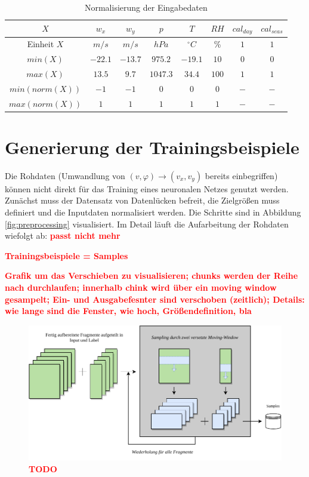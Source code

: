 \documentclass[
12pt, %
toc=listofnumbered, %
toc=chapterentrydotfill, %
numbers=noenddot, %
captions=tableheading, %
bibliography=numbered
]{scrreprt}
\let\Oldsection\section
\renewcommand{\section}{\FloatBarrier\Oldsection}
\newcommand{\highlight}[1]{\textbf{\textcolor{red}{#1}}}
\begin{document}
\begin{table}[ht]
	\centering
	\caption{Normalisierung der Eingabedaten}
	\begin{tabular}{|c|c|c|c|c|c|c|c|}
		\hline
		\rowcolor{color80}
		\textbf{$X$} & \textbf{$w_x$} & \textbf{$w_y$} & \textbf{$p$} & \textbf{$T$} & \textbf{$RH$} & \textbf{$cal_{day}$} & \textbf{$cal_{seas}$} \\ \hline
		Einheit $X$ & $m/s$ & $m/s$ & $hPa$ & $^\circ C$ & \% & $1$ & $1$ \\ \hline
		$min(X)$       & $-22.1$ & $-13.7$ & $975.2$ & $-19.1$ & $10$ & $0$ & $0$ \\ \hline
		$max(X)$       & $13.5$ & $9.7$ & $1047.3$ & $34.4$ & $100$ & $1$ & $1$ \\ \hline
		$min(norm(X))$ & $-1$ & $-1$ & $0$ & $0$ & $0$ & $-$ & $-$ \\ \hline
		$max(norm(X))$ & $1$ & $1$ & $1$ & $1$ & $1$ & $-$ & $-$ \\ \hline
	\end{tabular}
\label{tab:normalisierung}
\end{table}

\section{Generierung der Trainingsbeispiele}
Die Rohdaten (Umwandlung von $(v,\varphi) \rightarrow (v_x,v_y)$ bereits einbegriffen) können nicht direkt für das Training eines neuronalen Netzes genutzt werden. Zunächst muss der Datensatz von Datenlücken befreit, die Zielgrößen muss definiert und die Inputdaten normalisiert werden. Die Schritte sind in Abbildung \ref{fig:preprocessing} visualisiert. Im Detail läuft die Aufarbeitung der Rohdaten wiefolgt ab: \highlight{passt nicht mehr}

\highlight{Trainingsbeispiele = Samples}

\highlight{Grafik um das Verschieben zu visualisieren; chunks werden der Reihe nach durchlaufen; 
innerhalb chink wird über ein moving window gesampelt; Ein- und Ausgabefesnter sind verschoben (zeitlich); 
Details: wie lange sind die Fenster, wie hoch, Größendefinition, bla}


\begin{figure}[tph]
	\begin{center}
		\includegraphics[]{./images/sampling.pdf}
		\caption{\highlight{{TODO}}}
		\label{fig:sampling}
	\end{center}
\end{figure}
\end{document}

